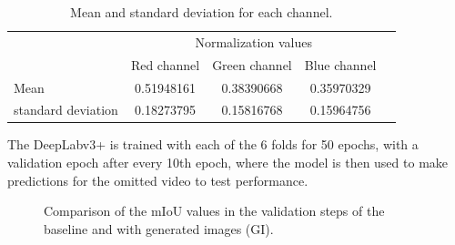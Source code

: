 \begin{table}[b]\vspace{1ex}
    \centering
    \caption[Mean and standard deviation]{Mean and standard deviation for each channel.\label{std_mean_table}}
    \begin{tabular*}{15cm}{l|@{\extracolsep\fill}cccc}
    &\multicolumn{3}{c}{Normalization values} \\
    & Red channel & Green channel & Blue channel  \\\hline
    Mean & 0.51948161  & 0.38390668 & 0.35970329 \\%
    standard deviation & 0.18273795 &  0.15816768 &  0.15964756\\\hline
    \end{tabular*}
    \captionsetup{justification=centering}
\vspace{2ex}\end{table}
The DeepLabv3+ is trained with each of the 6 folds for 50 epochs, with a validation epoch after every 10th epoch, where the model is then used to make predictions for the omitted video to test performance.
\begin{figure}[bt]
    \centering
    \hfill
    
    \vspace{0.5cm}
    
    \hfill
    
    \caption{Comparison of the mIoU values in the validation steps of the baseline and with generated images (GI).}\label{fig:segment_bl}
\end{figure}



